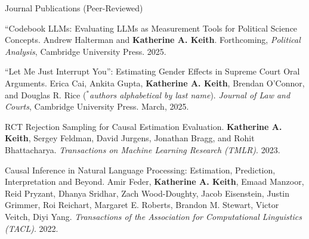 \documentclass{resume} %
\begin{document}
%
\begin{rSection}{Journal Publications (Peer-Reviewed)}
\begin{etaremune}

\item ``Codebook LLMs: Evaluating LLMs as Measurement Tools for Political Science Concepts. 
Andrew Halterman and \textbf{Katherine A. Keith}. 
Forthcoming, \emph{Political Analysis}, Cambridge University Press. 2025.  
\item ``Let Me Just Interrupt You'': Estimating Gender Effects in Supreme Court Oral Arguments. 
Erica Cai, Ankita Gupta, \textbf{Katherine A. Keith}, Brendan O'Connor, and Douglas R. Rice ($^*$\emph{authors alphabetical by last name}). 
\emph{Journal of Law and Courts}, Cambridge University Press. March, 2025. 
\item RCT Rejection Sampling for Causal Estimation Evaluation. 
\textbf{Katherine A. Keith}, Sergey Feldman, David Jurgens, Jonathan Bragg, and Rohit Bhattacharya.
\emph{Transactions on Machine Learning Research (TMLR)}. 2023.  


\item Causal Inference in Natural Language Processing: Estimation, Prediction, Interpretation and Beyond. Amir Feder, \textbf{Katherine A. Keith}, Emaad Manzoor, Reid Pryzant, Dhanya Sridhar, Zach Wood-Doughty, Jacob Eisenstein, Justin Grimmer, Roi Reichart, Margaret E. Roberts, Brandon M. Stewart, Victor Veitch, Diyi Yang.
\emph{Transactions of the Association for Computational Linguistics (TACL)}. 2022.  

\end{etaremune}
\end{rSection}
\end{document}
